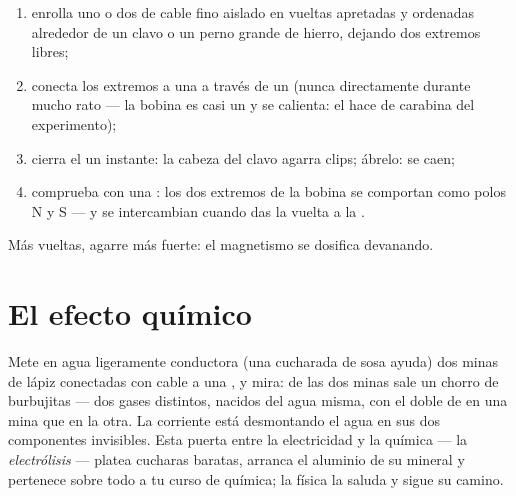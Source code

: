 \begin{method}\label{met:g8:electric-current-effects:wind}
\begin{enumerate}
  \item enrolla uno o dos  de cable fino aislado en vueltas
        apretadas y ordenadas alrededor de un clavo o un perno
        grande de hierro, dejando dos extremos libres;
  \item conecta los extremos a una  a través de un
         (nunca directamente durante mucho rato ---
        la bobina es casi un  y se calienta: el
         hace de carabina del experimento);
  \item cierra el  un instante: la cabeza del clavo
        agarra clips; ábrelo: se caen;
  \item comprueba con una : los dos extremos de la bobina se
        comportan como polos N y S --- y se intercambian cuando das
        la vuelta a la .
\end{enumerate}
Más vueltas, agarre más fuerte: el magnetismo se dosifica devanando.
\end{method}

\section{El efecto químico}

\begin{example}\label{ex:g8:electric-current-effects:electrolysis}
Mete en agua ligeramente conductora (una cucharada de sosa ayuda) dos
minas de lápiz conectadas con cable a una , y mira: de las
dos minas sale un chorro de burbujitas --- dos gases distintos,
nacidos del agua misma, con el doble de  en una mina que en
la otra. La corriente está desmontando el agua en sus dos componentes
invisibles. Esta puerta entre la electricidad y la química --- la
\emph{electrólisis} --- platea cucharas baratas, arranca el aluminio
de su mineral y pertenece sobre todo a tu curso de química; la física
la saluda y sigue su camino.
\end{example}

